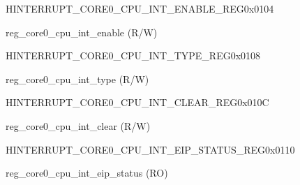 \begin{register}{H}{INTERRUPT\_CORE0\_CPU\_INT\_ENABLE\_REG}{0x0104}\label{regdesc:INTERRUPTCORE0CPUINTENABLEREG}
%
\regnewline%
\begin{regdesc}\begin{reglist}
\label{fielddesc:INTERRUPTCORE0CPUINTENABLE}\item [INTERRUPT\_CORE0\_CPU\_INT\_ENABLE] reg\_core0\_cpu\_int\_enable (R/W)
\end{reglist}\end{regdesc}
\end{register}


\begin{register}{H}{INTERRUPT\_CORE0\_CPU\_INT\_TYPE\_REG}{0x0108}\label{regdesc:INTERRUPTCORE0CPUINTTYPEREG}
%
\regnewline%
\begin{regdesc}\begin{reglist}
\label{fielddesc:INTERRUPTCORE0CPUINTTYPE}\item [INTERRUPT\_CORE0\_CPU\_INT\_TYPE] reg\_core0\_cpu\_int\_type (R/W)
\end{reglist}\end{regdesc}
\end{register}


\begin{register}{H}{INTERRUPT\_CORE0\_CPU\_INT\_CLEAR\_REG}{0x010C}\label{regdesc:INTERRUPTCORE0CPUINTCLEARREG}
%
\regnewline%
\begin{regdesc}\begin{reglist}
\label{fielddesc:INTERRUPTCORE0CPUINTCLEAR}\item [INTERRUPT\_CORE0\_CPU\_INT\_CLEAR] reg\_core0\_cpu\_int\_clear (R/W)
\end{reglist}\end{regdesc}
\end{register}


\begin{register}{H}{INTERRUPT\_CORE0\_CPU\_INT\_EIP\_STATUS\_REG}{0x0110}\label{regdesc:INTERRUPTCORE0CPUINTEIPSTATUSREG}
%
\regnewline%
\begin{regdesc}\begin{reglist}
\label{fielddesc:INTERRUPTCORE0CPUINTEIPSTATUS}\item [INTERRUPT\_CORE0\_CPU\_INT\_EIP\_STATUS] reg\_core0\_cpu\_int\_eip\_status (RO)
\end{reglist}\end{regdesc}
\end{register}


